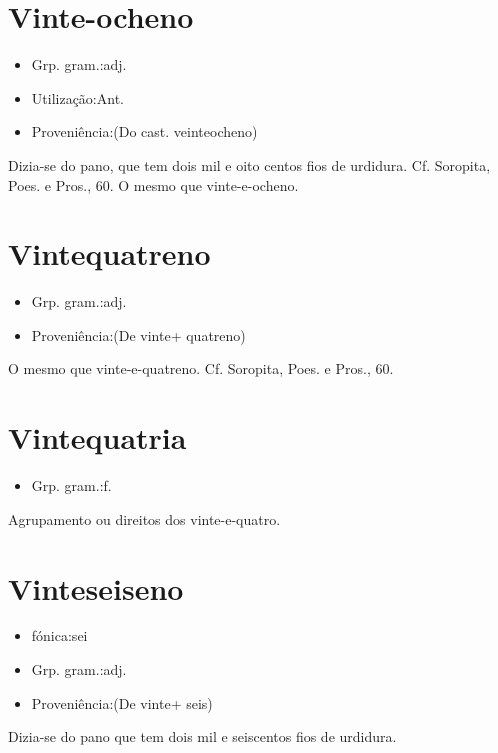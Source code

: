 \documentclass{article}
\begin{document}
\section{Vinte-ocheno}
\begin{itemize}
\item {Grp. gram.:adj.}
\end{itemize}
\begin{itemize}
\item {Utilização:Ant.}
\end{itemize}
\begin{itemize}
\item {Proveniência:(Do cast. \textunderscore veinteocheno\textunderscore )}
\end{itemize}
Dizia-se do pano, que tem dois mil e oito centos fios de urdidura. Cf. Soropita, \textunderscore Poes. e Pros.\textunderscore , 60.
O mesmo que \textunderscore vinte-e-ocheno\textunderscore .
\section{Vintequatreno}
\begin{itemize}
\item {Grp. gram.:adj.}
\end{itemize}
\begin{itemize}
\item {Proveniência:(De \textunderscore vinte\textunderscore  + \textunderscore quatreno\textunderscore )}
\end{itemize}
O mesmo que \textunderscore vinte-e-quatreno\textunderscore . Cf. Soropita, \textunderscore Poes. e Pros.\textunderscore , 60.
\section{Vintequatria}
\begin{itemize}
\item {Grp. gram.:f.}
\end{itemize}
Agrupamento ou direitos dos vinte-e-quatro.
\section{Vinteseiseno}
\begin{itemize}
\item {fónica:sei}
\end{itemize}
\begin{itemize}
\item {Grp. gram.:adj.}
\end{itemize}
\begin{itemize}
\item {Proveniência:(De \textunderscore vinte\textunderscore  + \textunderscore seis\textunderscore )}
\end{itemize}
Dizia-se do pano que tem dois mil e seiscentos fios de urdidura.
\end{document}
